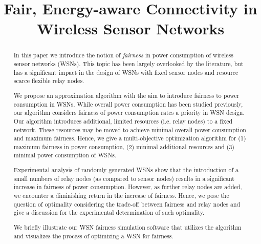 \documentclass[11pt,conference]{IEEEtran}
\begin{document}
\title{Fair, Energy-aware Connectivity in Wireless Sensor Networks}
\author{
\and
{}
\and
{}
}

\maketitle



\begin{abstract}
In this paper we introduce the notion of \textit{fairness} in power consumption of wireless sensor networks (WSNs). This topic has been largely overlooked by the literature, but has a significant impact in the design of WSNs with fixed sensor nodes and resource scarce flexible relay nodes.

We propose an approximation algorithm with the aim to introduce fairness to power consumption in WSNs. While overall power consumption has been studied previously, our algorithm considers fairness of power consumption rates a priority in WSN design. Our algorithm introduces additional, limited resources (i.e. relay nodes) to a fixed network. These resources may be moved to achieve minimal overall power consumption and maximum fairness. Hence, we give a multi-objective optimization algorithm for (1) maximum fairness in power consumption, (2) minimal additional resources and (3) minimal power consumption of WSNs.

Experimental analysis of randomly generated WSNs show that the introduction of a small numbers of relay nodes (as compared to sensor nodes) results in a significant increase in fairness of power consumption. However, as further relay nodes are added, we encounter a diminishing return in the increase of fairness. Hence, we pose the question of optimality considering the trade-off between fairness and relay nodes and give a discussion for the experimental determination of such optimality.

We briefly illustrate our WSN fairness simulation software that utilizes the algorithm and visualizes the process of optimizing a WSN for fairness.
\end{abstract}
\end{document}

